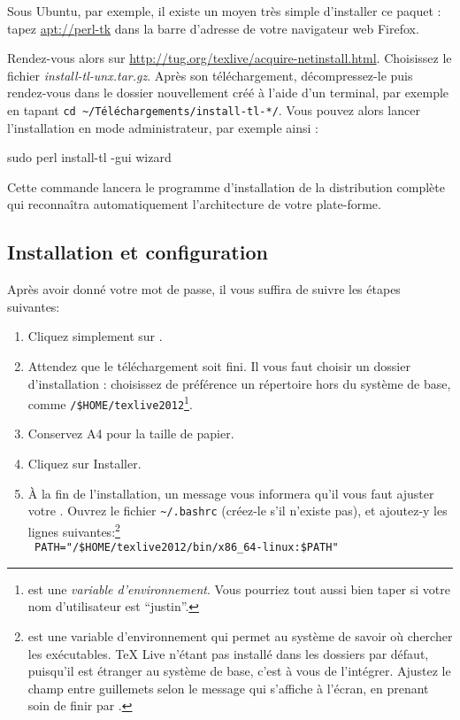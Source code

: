 Sous Ubuntu, par exemple, il existe un moyen très simple d'installer ce paquet : tapez \url{apt://perl-tk} dans la barre d'adresse de votre navigateur web Firefox.

Rendez-vous alors sur \url{http://tug.org/texlive/acquire-netinstall.html}. Choisissez  le fichier \emph{install-tl-unx.tar.gz}. Après son téléchargement,  décompressez-le puis rendez-vous dans le dossier nouvellement créé à l'aide d'un terminal, par exemple en tapant \verb|cd ~/Téléchargements/install-tl-*/|. Vous pouvez alors lancer l'installation en mode administrateur, par exemple ainsi :

\begin{bashcode}
sudo perl install-tl -gui wizard
\end{bashcode}
Cette commande lancera le programme d'installation de la distribution complète qui reconnaîtra automatiquement l'architecture de votre plate-forme.

\subsection{Installation et configuration}

Après avoir donné votre mot de passe, il vous suffira de suivre les étapes suivantes:

\begin{enumerate}
\item Cliquez simplement sur .
\item Attendez que le téléchargement soit fini. Il vous faut choisir un dossier d'installation : choisissez de préférence un répertoire hors du système de base, comme \verb|/$HOME/texlive2012|\footnote{ est une \emph{variable d'environnement}. Vous pourriez tout aussi bien taper  si votre nom d'utilisateur est \enquote{justin}.}.
\item Conservez A4 pour la taille de papier.
\item Cliquez sur Installer.
\item À la fin de l'installation, un message vous informera qu'il vous faut ajuster votre . Ouvrez le fichier \verb|~/.bashrc| (créez-le s'il n'existe pas), et ajoutez-y les lignes suivantes:\footnote{ est une variable d'environnement qui permet au système de savoir où chercher les exécutables. TeX Live n'étant pas installé dans les dossiers par défaut, puisqu'il est étranger au système de base, c'est à vous de l'intégrer. Ajustez le champ entre guillemets selon le message qui s'affiche à l'écran, en prenant soin de finir par  .}\\
\verb| PATH="/$HOME/texlive2012/bin/x86_64-linux:$PATH"|
\end{enumerate}

